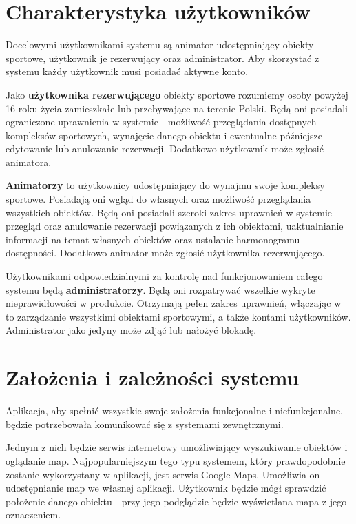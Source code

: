 \documentclass[a4paper,11pt]{article}
\begin{document}
\section{Charakterystyka użytkowników}

    Docelowymi użytkownikami systemu są animator udostępniający obiekty sportowe, użytkownik je rezerwujący oraz administrator. Aby skorzystać z systemu każdy użytkownik musi posiadać aktywne konto.

    Jako \textbf{użytkownika rezerwującego} obiekty sportowe rozumiemy osoby powyżej 16 roku życia zamieszkałe lub przebywające na terenie Polski. Będą oni posiadali ograniczone uprawnienia w systemie - możliwość przeglądania dostępnych kompleksów sportowych, wynajęcie danego obiektu i ewentualne późniejsze edytowanie lub anulowanie rezerwacji. Dodatkowo użytkownik może zgłosić animatora. 

    \textbf{Animatorzy} to użytkownicy udostępniający do wynajmu swoje kompleksy sportowe. Posiadają oni wgląd do własnych oraz możliwość przeglądania wszystkich obiektów. Będą oni posiadali szeroki zakres uprawnień w systemie - przegląd oraz anulowanie rezerwacji powiązanych z ich obiektami, uaktualnianie informacji na temat własnych obiektów oraz ustalanie harmonogramu dostępności. Dodatkowo animator może zgłosić użytkownika rezerwującego. 

    Użytkownikami odpowiedzialnymi za kontrolę nad funkcjonowaniem całego systemu będą \textbf{administratorzy}. Będą oni rozpatrywać wszelkie wykryte nieprawidłowości w produkcie. Otrzymają pełen zakres uprawnień, włączając w to zarządzanie wszystkimi obiektami sportowymi, a także kontami użytkowników. Administrator jako jedyny może zdjąć lub nałożyć blokadę.

\section{Założenia i zależności systemu}

    Aplikacja, aby spełnić wszystkie swoje założenia funkcjonalne i niefunkcjonalne, będzie potrzebowała komunikować się z systemami zewnętrznymi. 

    Jednym z nich będzie serwis internetowy umożliwiający wyszukiwanie obiektów i oglądanie map. Najpopularniejszym tego typu systemem, który prawdopodobnie zostanie wykorzystany w aplikacji, jest serwis Google Maps. Umożliwia on udostępnianie map we własnej aplikacji. Użytkownik będzie mógł sprawdzić położenie danego obiektu - przy jego podglądzie będzie wyświetlana mapa z jego oznaczeniem.
\end{document}
